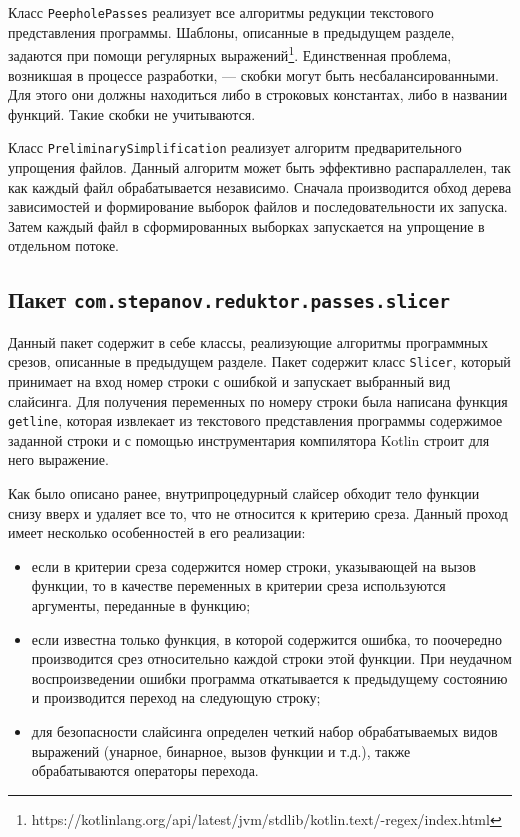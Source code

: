 Класс \texttt{PeepholePasses} реализует все алгоритмы редукции текстового представления программы. Шаблоны, описанные в предыдущем разделе, задаются при помощи регулярных выражений\footnote{https://kotlinlang.org/api/latest/jvm/stdlib/kotlin.text/-regex/index.html}. Единственная проблема, возникшая в процессе разработки, --- скобки могут быть несбалансированными. Для этого они должны находиться либо в строковых константах, либо в названии функций. Такие скобки не учитываются.

Класс \texttt{PreliminarySimplification} реализует алгоритм предварительного упрощения файлов. Данный алгоритм может быть эффективно распараллелен, так как каждый файл обрабатывается независимо. Сначала производится обход дерева зависимостей и формирование выборок файлов и последовательности их запуска. Затем каждый файл в сформированных выборках запускается на упрощение в отдельном потоке.

\subsection{Пакет \texttt{com.stepanov.reduktor.passes.slicer}}
Данный пакет содержит в себе классы, реализующие алгоритмы программных срезов, описанные в предыдущем разделе. Пакет содержит класс \texttt{Slicer}, который принимает на вход номер строки с ошибкой и запускает выбранный вид слайсинга. Для получения переменных по номеру строки была написана функция \texttt{getline}, которая извлекает из текстового представления программы содержимое заданной строки и с помощью инструментария компилятора Kotlin строит для него выражение.

Как было описано ранее, внутрипроцедурный слайсер обходит тело функции снизу вверх и удаляет все то, что не относится к критерию среза. Данный проход имеет несколько особенностей в его реализации:
\begin{itemize}
	\item если в критерии среза содержится номер строки, указывающей на вызов функции, то в качестве переменных в критерии среза используются аргументы, переданные в функцию;
	\item если известна только функция, в которой содержится ошибка, то поочередно производится срез относительно каждой строки этой функции. При неудачном воспроизведении ошибки программа откатывается к предыдущему состоянию и производится переход на следующую строку;
	\item для безопасности слайсинга определен четкий набор обрабатываемых видов выражений (унарное, бинарное, вызов функции и т.д.), также обрабатываются операторы перехода.
\end{itemize}

